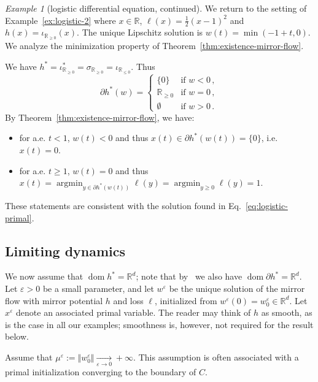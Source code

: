 \documentclass[11pt,english,reqno]{article}
\DeclareMathOperator*{\argmin}{argmin}
\DeclareMathOperator{\dom}{dom}
\newcommand{\R}{\mathbb{R}}
\renewcommand{\leq}{\leqslant}
\renewcommand{\geq}{\geqslant}
\theoremstyle{plain}
\theoremstyle{definition}
\theoremstyle{remark}
\newtheorem{example}[proposition]{Example}
\numberwithin{equation}{section}
\begin{document}
\begin{example}[logistic differential equation, continued]
	\label{ex:logistic-3}
	We return to the setting of Example~\ref{ex:logistic-2} where $x \in \R$, $\ell(x) = \frac{1}{2}(x - 1)^2$ and $h(x) = \iota_{\R_{\geq 0}}(x)$. The unique Lipschitz solution is $w(t) = \min(-1+t,0)$. We analyze the minimization property of Theorem~\ref{thm:existence-mirror-flow}.

	We have $h^* = \iota_{\R_{\geq 0}}^* = \sigma_{\R_{\geq 0}} = \iota_{\R_{\leq 0}}$. Thus 
\begin{equation*}
	\partial h^*(w) = \begin{cases}
		\{0\} & \text{if } w < 0 \, , \\
		\R_{\geq 0} & \text{if } w = 0 \, , \\
		\emptyset & \text{if } w > 0 \, .
	\end{cases}
\end{equation*}
By Theorem~\ref{thm:existence-mirror-flow}, we have:
\begin{itemize}
	\item for a.e. $t < 1$, $w(t) < 0$ and thus $x(t) \in \partial h^*(w(t)) = \{0\}$, i.e. $x(t) = 0$.
	\item for a.e. $t \geq 1$, $w(t) = 0$ and thus $x(t) = \argmin_{y \in \partial h^*(w(t))} \ell(y) = \argmin_{y \geq 0} \ell(y) = 1$.
\end{itemize}
These statements are consistent with the solution found in Eq.~\eqref{eq:logistic-primal}. 
\end{example}

\subsection{Limiting dynamics}
\label{sec:limiting}

We now assume that $\dom h^* = \R^d$; note that by~\cite[Coro.~16.18]{bauschke2017convex} we also have $\dom \partial h^* = \R^d$. Let $\varepsilon > 0$ be a small parameter, and let $w^\varepsilon$ be the unique solution of the mirror flow with mirror potential $h$ and loss $\ell$, initialized from $w^\varepsilon(0) = w^\varepsilon_0 \in \R^d$. Let $x^\varepsilon$ denote an associated primal variable. The reader may think of $h$ as smooth, as is the case in all our examples; smoothness is, however, not required for the result below.

Assume that $\mu^\varepsilon := \Vert w^\varepsilon_0 \Vert \xrightarrow[\varepsilon\to 0]{} + \infty$. This assumption is often associated with a primal initialization converging to the boundary of $C$.
\end{document}
